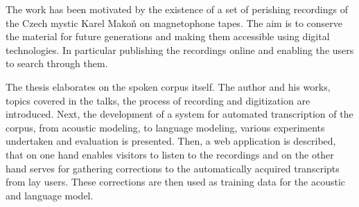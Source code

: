 The work has been motivated by the existence of a set of perishing recordings
of the Czech mystic Karel Makoň on magnetophone tapes. The aim is to conserve
the material for future generations and making them accessible using
digital technologies. In particular publishing the recordings online
and enabling the users to search through them.

The thesis elaborates on the spoken corpus itself. The
author and his works, topics covered in the talks, the process of recording
and digitization are introduced. Next, the development of a system for automated transcription of
the corpus, from acoustic modeling, to language modeling, various experiments
undertaken and evaluation is presented. Then, a web application is described,
that on one hand enables visitors to listen to the recordings and on the other
hand serves for gathering corrections to the automatically acquired transcripts from lay users.
These corrections are then used as training data for the acoustic and language
model.
